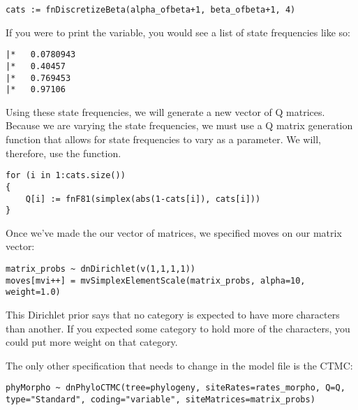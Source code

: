 {\tt \begin{snugshade*}
\begin{lstlisting}
cats := fnDiscretizeBeta(alpha_ofbeta+1, beta_ofbeta+1, 4)
\end{lstlisting}
\end{snugshade*}}

If you were to print the  variable, you would see a list of state frequencies like so:

{\tiny{\tt \begin{snugshade*}
\begin{lstlisting}
|*   0.0780943
|*   0.40457
|*   0.769453
|*   0.97106
\end{lstlisting}
\end{snugshade*}}}

Using these state frequencies, we will generate a new vector of Q matrices.
Because we are varying the state frequencies, we must use a Q matrix generation function that allows for state frequencies to vary as a parameter.
We will, therefore, use the  function.

{\tt \begin{snugshade*}
\begin{lstlisting}
for (i in 1:cats.size())
{
    Q[i] := fnF81(simplex(abs(1-cats[i]), cats[i]))
}
\end{lstlisting}
\end{snugshade*}}

Once we've made the our vector of matrices, we specified moves on our matrix vector:
{\tt \begin{snugshade*}
\begin{lstlisting}
matrix_probs ~ dnDirichlet(v(1,1,1,1))
moves[mvi++] = mvSimplexElementScale(matrix_probs, alpha=10, weight=1.0) 
\end{lstlisting}
\end{snugshade*}}

This Dirichlet prior says that no category is expected to have more characters than another. If you expected some category to hold more of the characters, you could put more weight on that category. \par

The only other specification that needs to change in the model file is the CTMC:
{\tt \begin{snugshade*}
\begin{lstlisting}
phyMorpho ~ dnPhyloCTMC(tree=phylogeny, siteRates=rates_morpho, Q=Q, type="Standard", coding="variable", siteMatrices=matrix_probs)
\end{lstlisting}
\end{snugshade*}}

